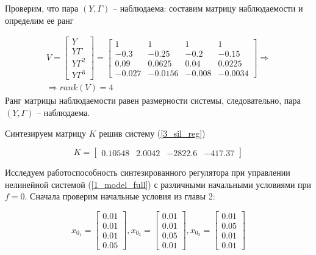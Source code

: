 Проверим, что пара $(Y, \Gamma)$ -- наблюдаема: составим матрицу наблюдаемости и определим ее ранг

\begin{multline}
    V = \begin{bmatrix}
        Y\\ Y \Gamma \\ Y \Gamma^2 \\ Y \Gamma^3
    \end{bmatrix} = \begin{bmatrix}
        1&	1 &1&	1\\
-0.3&-0.25&-0.2&-0.15\\
0.09&	0.0625	&0.04&0.0225\\
-0.027&	-0.0156	&-0.008&	-0.0034
    \end{bmatrix} \Rightarrow\\\Rightarrow rank(V) = 4
\end{multline}
Ранг матрицы наблюдаемости равен размерности системы, следовательно, пара $(Y, \Gamma)$ -- наблюдаема.

Синтезируем матрицу $K$ решив систему (\ref{3_sil_reg})

\begin{equation}
    K = \begin{bmatrix}
        0.10548 & 2.0042& -2822.6 & -417.37
    \end{bmatrix}
\end{equation}

Исследуем работоспособность синтезированного регулятора при управлении нелинейной системой (\ref{1_model_full}) с различными начальными условиями при $f=0$. Сначала проверим начальные условия из главы 2:

$$x_{0_1} = \begin{bmatrix}
     0.01\\
    0.01\\
    0.01\\
    0.05
\end{bmatrix},  x_{0_2} = \begin{bmatrix}
    0.01\\
    0.01\\
    0.05\\
    0.01
\end{bmatrix},  x_{0_3} = \begin{bmatrix}
    0.01\\
    0.05\\
    0.01\\
    0.01
\end{bmatrix}$$

